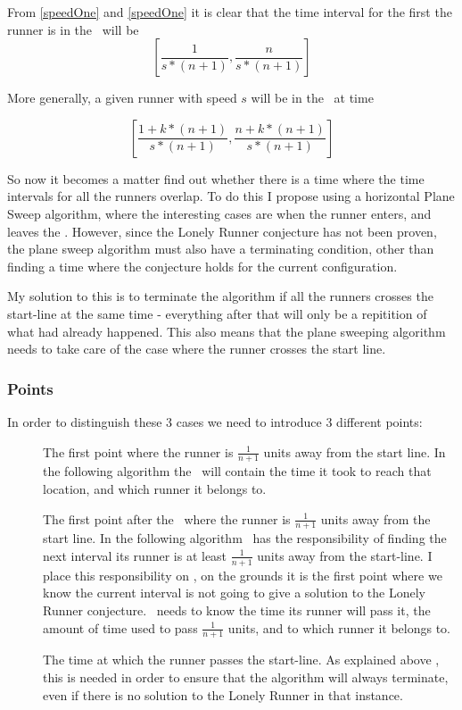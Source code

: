 From \ref{speedOne} and \ref{speedOne} it is clear that the time interval for the first the runner is in the \zone\, will be 
\begin{displaymath}
\left[\frac{1}{s * (n+1)}, \frac{n}{s * (n+1)}\right]
\end{displaymath}

More generally, a given runner with speed $s$ will be in the \zone\, at time 

\begin{displaymath}
\left[\frac{1 + k * (n+1)}{s * (n+1)}, \frac{n + k * (n+1)}{s * (n+1)}\right] 
\end{displaymath}

So now it becomes a matter find out whether there is a time where the time intervals for all the runners overlap. To do this I propose using a horizontal Plane Sweep algorithm, where the interesting cases are when the runner enters, and leaves the \zone. However, since the Lonely Runner conjecture has not been proven, the plane sweep algorithm must also have a terminating condition, other than finding a time where the conjecture holds for the current configuration.

My solution to this is to terminate the algorithm if all the runners crosses the start-line at the same time - everything after that will only be a repitition of what had already happened. This also means that the plane sweeping algorithm needs to take care of the case where the runner crosses the start line.


\subsubsection{Points}

In order to distinguish these 3 cases we need to introduce 3 different points:
\begin{description}
\item[\comStart] The first point where the runner is $\frac{1}{n + 1}$ units away from the start line. In the following algorithm the \comStart\, will contain the time it took to reach that location, and which runner it belongs to.
\item[\comEnd] The first point after the \comStart\, where the runner is $\frac{1}{n + 1}$ units away from the start line. In the following algorithm \comEnd\, has the responsibility of finding the next interval its runner is at least $\frac{1}{n+1}$ units away from the start-line. I place this responsibility on \comEnd, on the grounds it is the first point where we know the current interval is not going to give a solution to the Lonely Runner conjecture. \comEnd\, needs to know the time its runner will pass it, the amount of time used to pass $\frac{1}{n+1}$ units, and to which runner it belongs to.
\item[\comFin] The time at which the runner passes the start-line. As explained above , this is needed in order to ensure that the algorithm will always terminate, even if there is no solution to the Lonely Runner in that instance.
\end{description}

